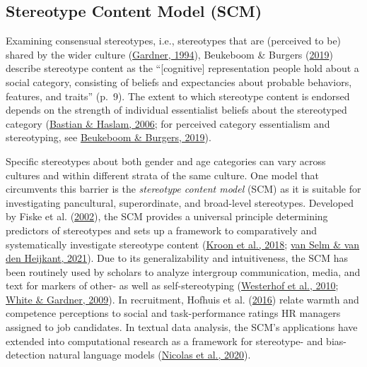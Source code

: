 \documentclass[
  12pt,
  letterpaper,
  DIV=11,
  numbers=noendperiod]{scrartcl}
\begin{document}
\hypertarget{scm}{%
\subsection{Stereotype Content Model (SCM)}\label{scm}}

Examining consensual stereotypes, i.e., stereotypes that are (perceived
to be) shared by the wider culture
(\protect\hyperlink{ref-Zanna2013}{Gardner, 1994}), Beukeboom \& Burgers
(\protect\hyperlink{ref-beukeboom2019HowStereotypesAre}{2019}) describe
stereotype content as the ``{[}cognitive{]} representation people hold
about a social category, consisting of beliefs and expectancies about
probable behaviors, features, and traits'' (p.~9). The extent to which
stereotype content is endorsed depends on the strength of individual
essentialist beliefs about the stereotyped category
(\protect\hyperlink{ref-bastian2006PsychologicalEssentialismStereotype}{Bastian
\& Haslam, 2006}; for perceived category essentialism and stereotyping,
see \protect\hyperlink{ref-beukeboom2019HowStereotypesAre}{Beukeboom \&
Burgers, 2019}).

Specific stereotypes about both gender and age categories can vary
across cultures and within different strata of the same culture. One
model that circumvents this barrier is the \emph{stereotype content
model} (SCM) as it is suitable for investigating pancultural,
superordinate, and broad-level stereotypes. Developed by Fiske et al.
(\protect\hyperlink{ref-fiske2002ModelOftenMixed}{2002}), the SCM
provides a universal principle determining predictors of stereotypes and
sets up a framework to comparatively and systematically investigate
stereotype content
(\protect\hyperlink{ref-kroon2018ReliableUnproductiveStereotypes}{Kroon
et al., 2018}; \protect\hyperlink{ref-vanselm2021SearchOlderWorker}{van
Selm \& van den Heijkant, 2021}). Due to its generalizability and
intuitiveness, the SCM has been routinely used by scholars to analyze
intergroup communication, media, and text for markers of other- as well
as self-stereotyping
(\protect\hyperlink{ref-westerhof2010FillingMissingLink}{Westerhof et
al., 2010}; \protect\hyperlink{ref-white2009ThinkWomenThink}{White \&
Gardner, 2009}). In recruitment, Hofhuis et al.
(\protect\hyperlink{ref-hofhuis2016DealingDifferencesImpact}{2016})
relate warmth and competence perceptions to social and task-performance
ratings HR managers assigned to job candidates. In textual data
analysis, the SCM's applications have extended into computational
research as a framework for stereotype- and bias-detection natural
language models
(\protect\hyperlink{ref-nicolas2020ComprehensiveStereotypeContent}{Nicolas
et al., 2020}).
\end{document}
